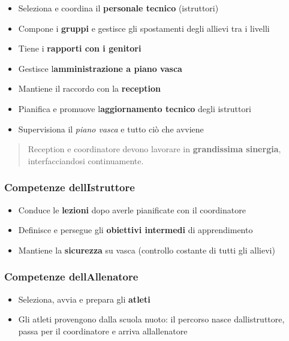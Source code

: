 \documentclass[a4paper,11pt]{article}
\providecommand{\tightlist}{%
  \setlength{\itemsep}{0pt}\setlength{\parskip}{0pt}}
\begin{document}
\begin{itemize}
      \tightlist
      \item
            Seleziona e coordina il \textbf{personale tecnico} (istruttori)
      \item
            Compone i \textbf{gruppi} e gestisce gli spostamenti degli allievi tra
            i livelli
      \item
            Tiene i \textbf{rapporti con i genitori}
      \item
            Gestisce l\textquotesingle{}\textbf{amministrazione a piano vasca}
      \item
            Mantiene il raccordo con la \textbf{reception}
      \item
            Pianifica e promuove l\textquotesingle{}\textbf{aggiornamento tecnico}
            degli istruttori
      \item
            Supervisiona il \emph{piano vasca} e tutto ciò che avviene
\end{itemize}

\begin{quote}
      Reception e coordinatore devono lavorare in \textbf{grandissima
            sinergia}, interfacciandosi continuamente.
\end{quote}

\subsubsection{Competenze
      dell\textquotesingle Istruttore}\label{competenze-dellistruttore}

\begin{itemize}
      \tightlist
      \item
            Conduce le \textbf{lezioni} dopo averle pianificate con il
            coordinatore
      \item
            Definisce e persegue gli \textbf{obiettivi intermedi} di apprendimento
      \item
            Mantiene la \textbf{sicurezza} su vasca (controllo costante di tutti
            gli allievi)
\end{itemize}

\subsubsection{Competenze
      dell\textquotesingle Allenatore}\label{competenze-dellallenatore}

\begin{itemize}
      \tightlist
      \item
            Seleziona, avvia e prepara gli \textbf{atleti}
      \item
            Gli atleti provengono dalla scuola nuoto: il percorso nasce
            dall\textquotesingle istruttore, passa per il coordinatore e arriva
            all\textquotesingle allenatore
\end{itemize}
\end{document}
